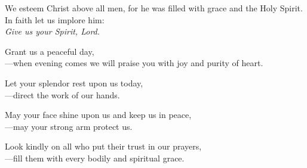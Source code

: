 \intercessions

\begin{raggedright}
We esteem Christ above all men, for he was filled with grace and the Holy Spirit. In faith let us implore him:\\
\emph{Give us your Spirit, Lord.}

\medskip
Grant us a peaceful day,\\
{\color{red}---}when evening comes we will praise you with joy and purity of heart.

\medskip
Let your splendor rest upon us today,\\
{\color{red}---}direct the work of our hands.

\medskip
May your face shine upon us and keep us in peace,\\
{\color{red}---}may your strong arm protect us.

\medskip
Look kindly on all who put their trust in our prayers,\\
{\color{red}---}fill them with every bodily and spiritual grace.
\end{raggedright}